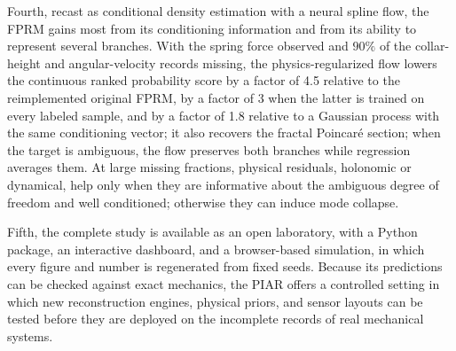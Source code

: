 Fourth, recast as conditional density estimation with a neural spline flow, the FPRM gains most from its conditioning information and from its ability to represent several branches. With the spring force observed and $90\%$ of the collar-height and angular-velocity records missing, the physics-regularized flow lowers the continuous ranked probability score by a factor of 4.5 relative to the reimplemented original FPRM, by a factor of 3 when the latter is trained on every labeled sample, and by a factor of 1.8 relative to a Gaussian process with the same conditioning vector; it also recovers the fractal Poincar\'e section; when the target is ambiguous, the flow preserves both branches while regression averages them. At large missing fractions, physical residuals, holonomic or dynamical, help only when they are informative about the ambiguous degree of freedom and well conditioned; otherwise they can induce mode collapse.

Fifth, the complete study is available as an open laboratory, with a Python package, an interactive dashboard, and a browser-based simulation, in which every figure and number is regenerated from fixed seeds. Because its predictions can be checked against exact mechanics, the PIAR offers a controlled setting in which new reconstruction engines, physical priors, and sensor layouts can be tested before they are deployed on the incomplete records of real mechanical systems.
